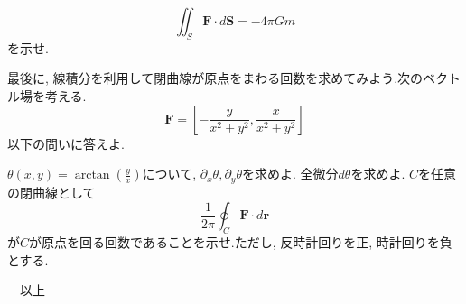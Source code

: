 \documentclass[a4j,dvipdfmx]{jsarticle}
\begin{document}
\begin{qparts}
\begin{qlist}
                    \begin{equation*}
                        \iint_S \bm{F}\cdot d\bm{S} = -4\pi Gm
                    \end{equation*}
                    を示せ.
            \end{qlist}
        \qpart 最後に, 線積分を利用して閉曲線が原点をまわる回数を求めてみよう.次のベクトル場を考える.
            \begin{equation*}
                \bm{F}=\left[-\frac{y}{x^2+y^2},\frac{x}{x^2+y^2}\right]
            \end{equation*}
            以下の問いに答えよ.
            \begin{qlist}
                \qitem $\theta(x,y)=\arctan\left(\frac{y}{x}\right)$について, $\partial_x \theta,\partial_y \theta$を求めよ.
                \qitem 全微分$d\theta$を求めよ.
                \qitem $C$を任意の閉曲線として
                    \begin{equation}
                        \frac{1}{2\pi}\oint_{C} \bm{F}\cdot d\bm{r}
                    \end{equation}
                    が$C$が原点を回る回数であることを示せ.ただし, 反時計回りを正, 時計回りを負とする.
            \end{qlist}
        \end{qparts}
    \hrulefill 　以上　\hrulefill
\end{document}
